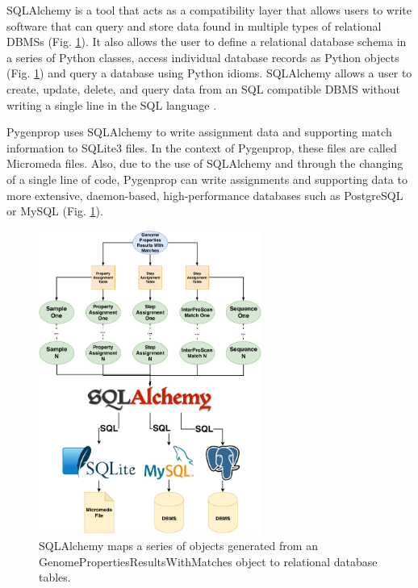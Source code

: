 SQLAlchemy \cite{bayer2014sqlalchemy} is a tool that acts as a compatibility layer that allows users to write software that can query and store data found in multiple types of relational DBMSs (Fig. \ref{fig:sqlalchemy}). It also allows the user to define a relational database schema in a series of Python classes, access individual database records as Python objects (Fig. \ref{fig:sqlalchemy}) and query a database using Python idioms. SQLAlchemy allows a user to create, update, delete, and query data from an SQL compatible DBMS without writing a single line in the SQL language \cite{bayer2014sqlalchemy}.

Pygenprop uses SQLAlchemy to write assignment data and supporting match information to SQLite3 files. In the context of Pygenprop, these files are called Micromeda files. Also, due to the use of SQLAlchemy and through the changing of a single line of code, Pygenprop can write assignments and supporting data to more extensive, daemon-based, high-performance databases such as PostgreSQL or MySQL (Fig. \ref{fig:sqlalchemy}).

\begin{figure}[!ht]
  \centering
	\includegraphics[width=0.65\textwidth]{media/SQLAlchemy.pdf}
	 \caption{SQLAlchemy maps a series of objects generated from an GenomePropertiesResultsWithMatches object to relational database tables.}
	 \label{fig:sqlalchemy}
\end{figure}

